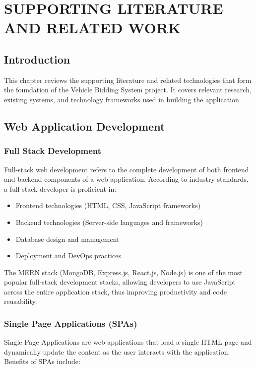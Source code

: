\chapter{SUPPORTING LITERATURE AND RELATED WORK}

\section{Introduction}

This chapter reviews the supporting literature and related technologies that form the foundation of the Vehicle Bidding System project. It covers relevant research, existing systems, and technology frameworks used in building the application.

\section{Web Application Development}

\subsection{Full Stack Development}

Full-stack web development refers to the complete development of both frontend and backend components of a web application. According to industry standards, a full-stack developer is proficient in:

\begin{itemize}
    \item Frontend technologies (HTML, CSS, JavaScript frameworks)
    \item Backend technologies (Server-side languages and frameworks)
    \item Database design and management
    \item Deployment and DevOps practices
\end{itemize}

The MERN stack (MongoDB, Express.js, React.js, Node.js) is one of the most popular full-stack development stacks, allowing developers to use JavaScript across the entire application stack, thus improving productivity and code reusability.

\subsection{Single Page Applications (SPAs)}

Single Page Applications are web applications that load a single HTML page and dynamically update the content as the user interacts with the application. Benefits of SPAs include:

